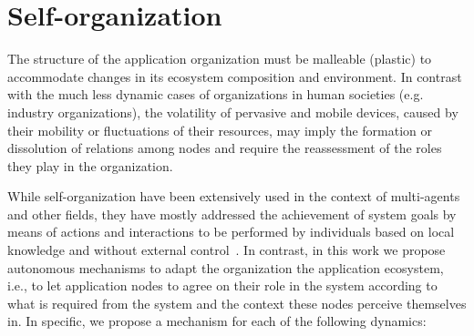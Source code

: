 \section{Self-organization}\label{sec:self_organization}




The structure of the application organization
must be malleable (plastic) to accommodate changes in its ecosystem composition and environment. In contrast with the much less dynamic cases of organizations in human societies (e.g. industry organizations), the volatility of pervasive and mobile devices, caused by their mobility or fluctuations of their resources, may imply the formation or dissolution of relations among nodes and require the reassessment of the roles they play in the organization. 

While self-organization have been extensively used in the context of multi-agents and other fields, they have mostly addressed the achievement of system goals by means of actions and interactions to be performed by individuals based on local knowledge and without external control~\cite{}. In contrast, in this work we propose autonomous mechanisms to adapt the organization the application ecosystem, i.e., to let application nodes to agree on their role in the system according to what is required from the system and the context these nodes perceive themselves in. In specific, we propose a mechanism for each of the following dynamics:


